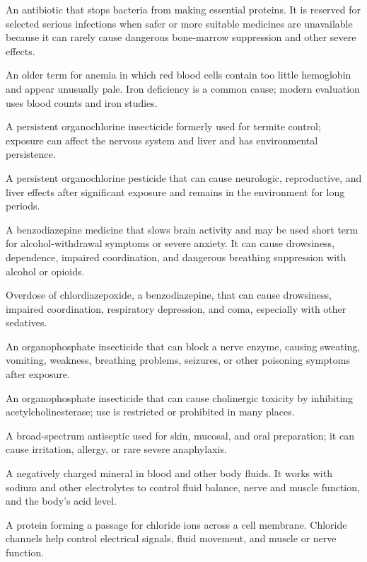  An antibiotic that stops bacteria from making essential proteins. It is reserved for selected serious infections when safer or more suitable medicines are unavailable because it can rarely cause dangerous bone-marrow suppression and other severe effects.

 An older term for anemia in which red blood cells contain too little hemoglobin and appear unusually pale. Iron deficiency is a common cause; modern evaluation uses blood counts and iron studies.

 A persistent organochlorine insecticide formerly used for termite control; exposure can affect the nervous system and liver and has environmental persistence.

 A persistent organochlorine pesticide that can cause neurologic, reproductive, and liver effects after significant exposure and remains in the environment for long periods.

 A benzodiazepine medicine that slows brain activity and may be used short term for alcohol-withdrawal symptoms or severe anxiety. It can cause drowsiness, dependence, impaired coordination, and dangerous breathing suppression with alcohol or opioids.

 Overdose of chlordiazepoxide, a benzodiazepine, that can cause drowsiness, impaired coordination, respiratory depression, and coma, especially with other sedatives.

 An organophosphate insecticide that can block a nerve enzyme, causing sweating, vomiting, weakness, breathing problems, seizures, or other poisoning symptoms after exposure.

 An organophosphate insecticide that can cause cholinergic toxicity by inhibiting acetylcholinesterase; use is restricted or prohibited in many places.

 A broad-spectrum antiseptic used for skin, mucosal, and oral preparation; it can cause irritation, allergy, or rare severe anaphylaxis.

 A negatively charged mineral in blood and other body fluids. It works with sodium and other electrolytes to control fluid balance, nerve and muscle function, and the body's acid level.

 A protein forming a passage for chloride ions across a cell membrane. Chloride channels help control electrical signals, fluid movement, and muscle or nerve function.


